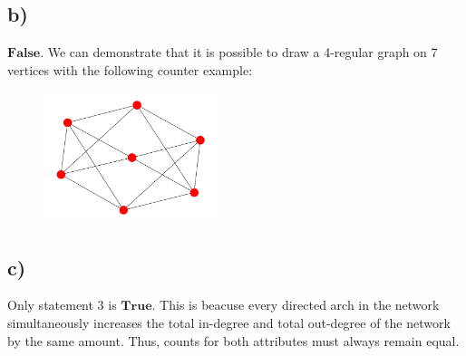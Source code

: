 \documentclass{article}
\begin{document}
            \subsection*{b)}
            \begin{minipage}[t]{1\textwidth}
                $\mathbf{False}$. We can demonstrate that it is possible to draw a 4-regular graph on 7
                vertices with the following counter example:
            \end{minipage}
            \begin{figure}[ht] %
                \begin{minipage}[t]{0.5\textwidth}
                    \centering
                    \includegraphics[width=2in]{four_regular.png}
                \end{minipage}%
            \end{figure}
            \subsection*{c)}
            \begin{minipage}[t]{1\textwidth}
                Only statement 3 is $\mathbf{True}$. This is beacuse every directed arch in the network
                simultaneously increases the total in-degree and total out-degree of the network by the
                same amount. Thus, counts for both attributes must always remain equal. 
            \end{minipage}
\end{document}
